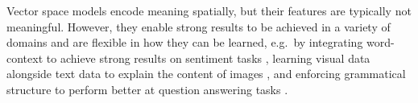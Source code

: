 


%





Vector space models encode meaning spatially, but their features are typically not meaningful. However, they enable strong results to be achieved in a variety of domains and   are flexible in how they can be learned, e.g.\ by integrating word-context  to achieve strong results on sentiment tasks \cite{Pennington2014}, learning visual data alongside text data to explain the content of images \cite{Mao2014a}, and enforcing grammatical structure to perform better at question answering tasks \cite{Palangi2017}. 


